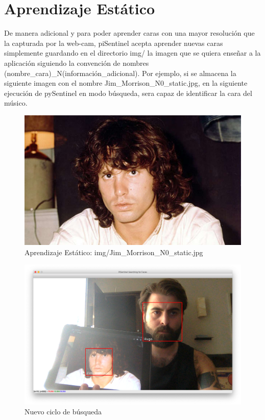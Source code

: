 \documentclass[a4paper,11pt]{book}
\begin{document}
\section{Aprendizaje Estático}

De manera adicional y para poder aprender caras con una mayor resolución que la capturada por la web-cam, piSentinel acepta aprender nuevas caras simplemente guardando en el directorio img/ la imagen que se quiera enseñar a la aplicación siguiendo la convención de nombres (nombre\_cara)\_N(información\_adicional). Por ejemplo, si se almacena la siguiente imagen con el nombre Jim\_Morrison\_N0\_static.jpg, en la siguiente ejecución de pySentinel en modo búsqueda, sera capaz de identificar la cara del músico. 

\begin{figure}[H]  
\centering 
\includegraphics[scale=0.2]{imagenes/Jim_Morrison_N0_static.jpg}
\caption{ Aprendizaje Estático: img/Jim\_Morrison\_N0\_static.jpg }  
\end{figure} 



\begin{figure}[H]  
\centering 
\includegraphics[scale=0.2]{imagenes/static.png}
\caption{ Nuevo ciclo de búsqueda }  
\end{figure} 
\end{document}
